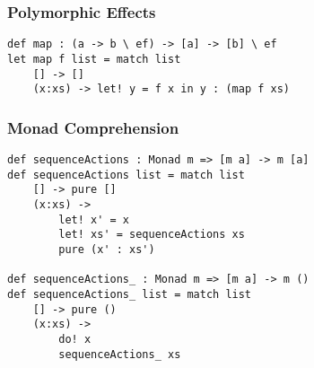 \documentclass{article}
\begin{document}
\subsubsection{Polymorphic Effects}
\begin{verbatim}
def map : (a -> b \ ef) -> [a] -> [b] \ ef
let map f list = match list
    [] -> []
    (x:xs) -> let! y = f x in y : (map f xs)
\end {verbatim}

\subsubsection{Monad Comprehension}
\begin{verbatim}
def sequenceActions : Monad m => [m a] -> m [a]
def sequenceActions list = match list
    [] -> pure []
    (x:xs) ->
        let! x' = x
        let! xs' = sequenceActions xs
        pure (x' : xs')

def sequenceActions_ : Monad m => [m a] -> m ()
def sequenceActions_ list = match list
    [] -> pure ()
    (x:xs) ->
        do! x
        sequenceActions_ xs
\end{verbatim}
\end{document}
